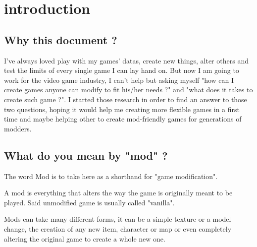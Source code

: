 \documentclass[a4paper,11pt]{article}
\begin{document}
\thispagestyle{empty}
\sffamily


\newpage
{}
\newpage


\section{introduction}

\subsection{Why this document ?}

I've always loved play with my games' datas, create new things, alter others and test the limits of every single game I can lay hand on. But now I am going to work for the video game industry, I can't help but asking myself "how can I create games anyone can modify to fit his/her needs ?" and "what does it takes to create such game ?". I started those research in order to find an answer to those two questions, hoping it would help me creating more flexible games in a first time and maybe helping other to create mod-friendly games for generations of modders.

\subsection{What do you mean by "mod" ?}

The word Mod is to take here as a shorthand for "game modification". 

A mod is everything that alters the way the game is originally meant to be played. Said unmodified game is usually called "vanilla".

Mods can take many different forms, it can be a simple texture or a model change, the creation of any new item, character or map or even completely altering the original game to create a whole new one.
\end{document}
